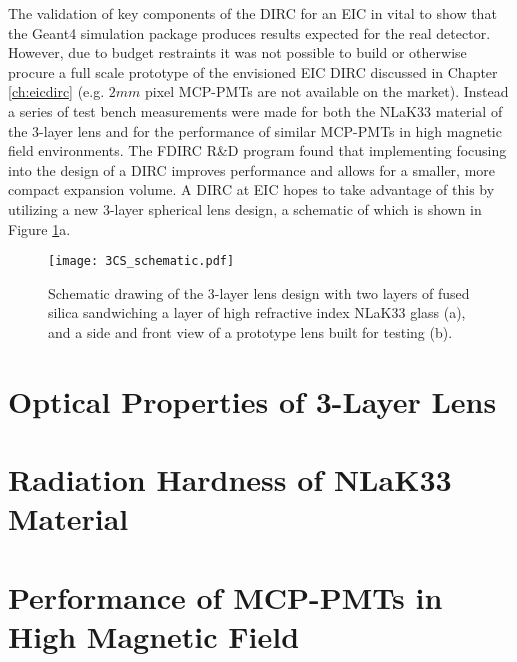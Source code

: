 \label{ch:components}
The validation of key components of the DIRC for an EIC in vital to show that the Geant4 simulation package produces results expected for the real detector. However, due to budget restraints it was not possible to build or otherwise procure a full scale prototype of the envisioned EIC DIRC discussed in Chapter \ref{ch:eicdirc} (e.g. $2\unit{mm}$ pixel MCP-PMTs are not available on the market). Instead a series of test bench measurements were made for both the NLaK33 material of the 3-layer lens and for the performance of similar MCP-PMTs in high magnetic field environments.
The FDIRC R\&D program found that implementing focusing into the design of a DIRC improves performance and allows for a smaller, more compact expansion volume. A DIRC at EIC hopes to take advantage of this by utilizing a new 3-layer spherical lens design, a schematic of which is shown in Figure \ref{fig:3CS_schematic}a. 

\begin{figure}[ht]
	\centering
	\texttt{[image: 3CS\_schematic.pdf]}
	\caption{Schematic drawing of the 3-layer lens design with two layers of fused silica sandwiching a layer of high refractive index NLaK33 glass (a), and a side and front view of a prototype lens built for testing (b).}
	\label{fig:3CS_schematic}
\end{figure}



\section{Optical Properties of 3-Layer Lens}


\section{Radiation Hardness of NLaK33 Material}

\section{Performance of MCP-PMTs in High Magnetic Field}